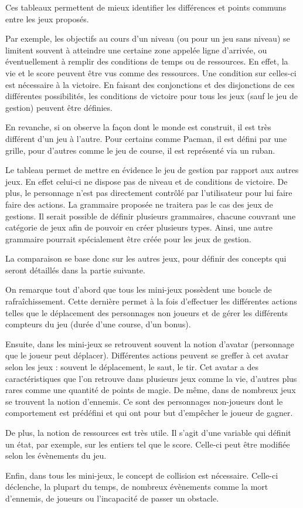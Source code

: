 \vspace{0.5cm}

Ces tableaux permettent de mieux identifier les différences et points communs entre les jeux proposés.

Par exemple, les objectifs au cours d'un niveau (ou pour un jeu sans niveau) se limitent souvent à atteindre une certaine zone
appelée ligne d'arrivée, ou éventuellement à remplir des conditions de temps ou de ressources. En effet, la vie et le score
peuvent être vus comme des ressources. Une condition sur celles-ci est nécessaire à la victoire.
En faisant des conjonctions et des disjonctions de ces différentes possibilités,
les conditions de victoire pour tous les jeux (sauf le jeu de gestion) peuvent être définies.

En revanche, si on observe la façon dont le monde est construit, il est très différent d'un jeu à l'autre.
Pour certains comme Pacman, il est défini par une grille, pour d'autres comme le jeu de course, il est représenté via un ruban.

Le tableau permet de mettre en évidence le jeu de gestion par rapport aux autres jeux.
En effet celui-ci ne dispose pas de niveau et de conditions de victoire.
De plus, le personnage n'est pas directement contrôlé par l'utilisateur pour lui faire faire des actions.
La grammaire proposée ne traitera pas le cas des jeux de gestions.
Il serait possible de définir plusieurs grammaires, chacune couvrant une catégorie de jeux afin de pouvoir en 
créer plusieurs types. Ainsi, une autre grammaire pourrait spécialement être créée pour les jeux de gestion.

La comparaison se base donc sur les autres jeux, pour définir des concepts qui seront détaillés dans la partie suivante.

\vspace{0.5cm}

On remarque tout d'abord que tous les mini-jeux possèdent une boucle de rafraîchissement.
Cette dernière permet à la fois d'effectuer les différentes actions telles que le déplacement des personnages non joueurs et de gérer 
les différents compteurs du jeu (durée d'une course, d'un bonus).

Ensuite, dans les mini-jeux se retrouvent souvent la notion d'avatar (personnage que le joueur peut déplacer).
Différentes actions peuvent se greffer à cet avatar selon les jeux : souvent le déplacement, le saut, le tir.
Cet avatar a des caractéristiques que l'on retrouve dans plusieurs jeux comme la vie, d'autres plus rares comme une quantité de points de magie.
De même, dans de nombreux jeux se trouvent la notion d'ennemis. Ce sont des personnages non-joueurs dont le comportement est prédéfini et qui ont pour but d'empêcher le joueur de gagner.

De plus, la notion de ressources est très utile. Il s'agit d'une variable qui définit un état, par exemple, sur les entiers tel que le score.
Celle-ci peut être modifiée selon les évènements du jeu.

Enfin, dans tous les mini-jeux, le concept de collision est nécessaire. Celle-ci déclenche, la plupart du temps, 
de nombreux évènements comme la mort d'ennemis, de joueurs ou l'incapacité de passer un obstacle.